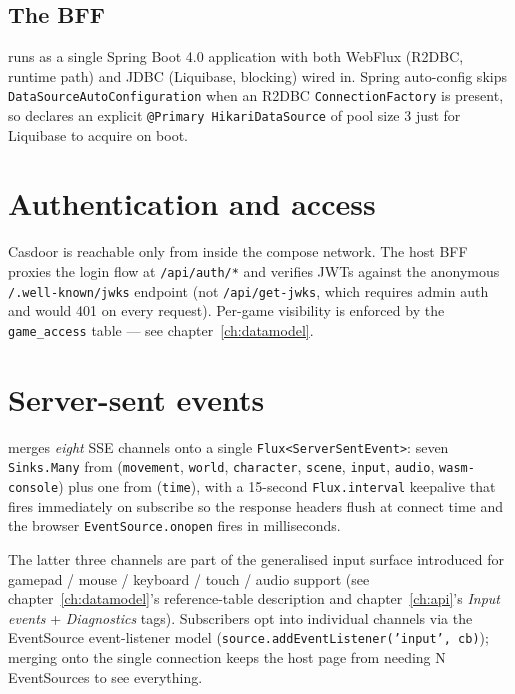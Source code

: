 \subsection{The BFF}

 runs as a single Spring Boot 4.0 application with both
WebFlux (R2DBC, runtime path) and JDBC (Liquibase, blocking) wired in.
Spring auto-config skips \texttt{DataSourceAutoConfiguration} when an
R2DBC \texttt{ConnectionFactory} is present, so
 declares an explicit
\texttt{@Primary HikariDataSource} of pool size 3 just for Liquibase to
acquire on boot.

\section{Authentication and access}

Casdoor is reachable only from inside the compose network. The host BFF
proxies the login flow at \texttt{/api/auth/*} and verifies JWTs against
the anonymous \texttt{/.well-known/jwks} endpoint (not
\texttt{/api/get-jwks}, which requires admin auth and would 401 on every
request). Per-game visibility is enforced by the \texttt{game\_access}
table — see chapter~\ref{ch:datamodel}.

\section{Server-sent events}

 merges \emph{eight} SSE channels onto a
single \texttt{Flux<ServerSentEvent>}: seven \texttt{Sinks.Many} from
 (\texttt{movement}, \texttt{world},
\texttt{character}, \texttt{scene}, \texttt{input}, \texttt{audio},
\texttt{wasm-console}) plus one from 
(\texttt{time}), with a 15-second \texttt{Flux.interval} keepalive
that fires immediately on subscribe so the response headers flush at
connect time and the browser \texttt{EventSource.onopen} fires in
milliseconds.

The latter three channels are part of the generalised input surface
introduced for gamepad / mouse / keyboard / touch / audio support
(see chapter~\ref{ch:datamodel}'s reference-table description and
chapter~\ref{ch:api}'s \emph{Input events} + \emph{Diagnostics} tags).
Subscribers opt into individual channels via the EventSource
event-listener model (\texttt{source.addEventListener('input', cb)});
merging onto the single connection keeps the host page from needing
N EventSources to see everything.

